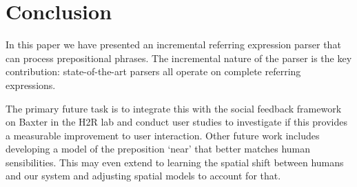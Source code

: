 \documentclass[conference]{IEEEtran}
\numberwithin{equation}{section}
\begin{document}
\section{Conclusion}
In this paper we have presented an incremental referring expression parser that can process prepositional phrases. The incremental nature of the parser is the key contribution: state-of-the-art parsers all operate on complete referring expressions. %

The primary future task is to integrate this with the social feedback framework on Baxter in the H2R lab and conduct user studies to investigate if this provides a measurable improvement to user interaction. Other future work includes developing a model of the preposition `near' that better matches human sensibilities. This may even extend to learning the spatial shift between humans and our system and adjusting spatial models to account for that.

\printbibliography
\end{document}

